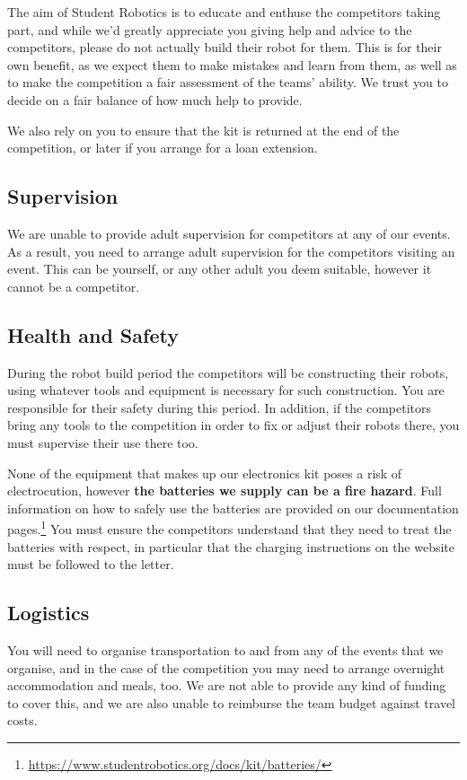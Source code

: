 \documentclass[a4paper]{article}
\begin{document}
The aim of Student Robotics is to educate and enthuse the competitors taking
part, and while we'd greatly appreciate you giving help and advice to the
competitors, please do not actually build their robot for them.
This is for their own benefit, as we expect them to make mistakes and
learn from them, as well as to make the competition a fair assessment of the
teams' ability. We trust you to decide on a fair balance of how much help to
provide.

We also rely on you to ensure that the kit is returned at the end of the
competition, or later if you arrange for a loan extension.

\subsection*{Supervision}

We are unable to provide adult supervision for competitors at any of our
events. As a result, you need to arrange adult supervision for the competitors
visiting an event. This can be yourself, or any other adult you deem suitable,
however it cannot be a competitor.

\subsection*{Health and Safety}

During the robot build period the competitors will be constructing
their robots, using whatever tools and equipment is necessary for such
construction. You are responsible for their safety during this
period. In addition, if the competitors bring any tools to the competition in
order to fix or adjust their robots there, you must supervise their use
there too.

None of the equipment that makes up our electronics kit poses a risk of
electrocution, however \textbf{the batteries we supply can be a fire hazard}.
Full information on how to safely use the batteries are provided on our
documentation
pages.\footnote{\url{https://www.studentrobotics.org/docs/kit/batteries/}}
You must ensure the competitors understand that they need to treat the
batteries with respect, in particular that the charging instructions on
the website must be followed to the letter.

\subsection*{Logistics}

You will need to organise transportation to and from any of the events that we
organise, and in the case of the competition you may need to arrange overnight
accommodation and meals, too. We are not able to provide any kind of funding to
cover this, and we are also unable to reimburse the team budget against travel
costs.
\end{document}
